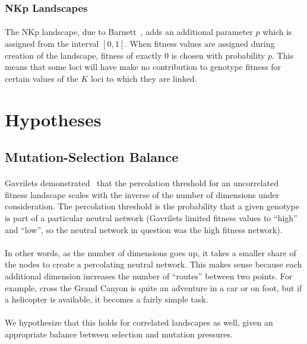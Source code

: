 \documentclass[12pt,letterpaper,titlepage,draft]{article}
\begin{document}
\subsubsection{NKp Landscapes}

\paragraph{}
The NKp landscape, due to Barnett~\cite{Barnett1998}, adds an additional
parameter $p$ which is assigned from the interval $\left[0,1\right]$. When
fitness values are assigned during creation of the landscape, fitness of
exactly 0 is chosen with probability $p$. This means that some loci will have
make no contribution to genotype fitness for certain values of the $K$ loci to
which they are linked.

\section{Hypotheses}

\subsection{Mutation-Selection Balance}

\paragraph{}
Gavrilets demonstrated~\cite{Gavrilets1997} that the percolation threshold for
an uncorrelated fitness landscape scales with the inverse of the number of
dimensions under consideration. The percolation threshold is the probability
that a given genotype is part of a particular neutral network (Gavrilets
limited fitness values to ``high'' and ``low'', so the neutral network in
question was the high fitness network).

\paragraph{}
In other words, as the number of dimensions goes up, it takes a smaller share
of the nodes to create a percolating neutral network. This makes sense because
each additional dimension increases the number of ``routes'' between two
points. For example, cross the Grand Canyon is quite an adventure in a car or
on foot, but if a helicopter is available, it becomes a fairly simple task.

\paragraph{}
We hypothesize that this holds for correlated landscapes as well, given an
appropriate balance between selection and mutation pressures.
\end{document}
